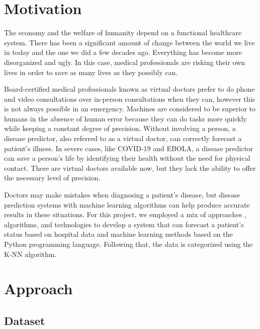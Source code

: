 \section{Motivation}
\label{chap:Motivation}


The economy and the welfare of humanity depend on a functional healthcare system. There has been a significant amount of change between the world we live 
in today and the one we did a few decades ago. Everything has become more disorganized and ugly. In this case,
 medical professionals are risking their own lives in order to save as many lives as they possibly can.

 Board-certified medical professionals known as virtual doctors prefer to do phone and video consultations over in-person 
 consultations when they can, however this is not always possible in an emergency. Machines are considered to be 
 superior to humans in the absence of human error because they can do tasks more quickly while keeping a constant 
 degree of precision. Without involving a person, a disease predictor, also referred to as a virtual doctor, can 
 correctly forecast a patient's illness. In severe cases, like COVID-19 and EBOLA, a disease predictor can save a 
 person's life by identifying their health without the need for physical contact. There are virtual doctors 
 available now, but they lack the ability to offer the necessary level of precision.

Doctors may make mistakes when diagnosing a patient's disease, but disease prediction systems with machine learning 
algorithms can help produce accurate results in these situations. For this project, we employed a mix of approaches
, algorithms, and technologies to develop a system that can forecast a patient's status based on hospital data and
 machine learning methods based on the Python programming language. 
 Following that, the data is categorized using the K-NN algorithm.
\\

\section{Approach}
\label{chap:Approach}
\subsection{Dataset}
\label{sec:Dataset}

